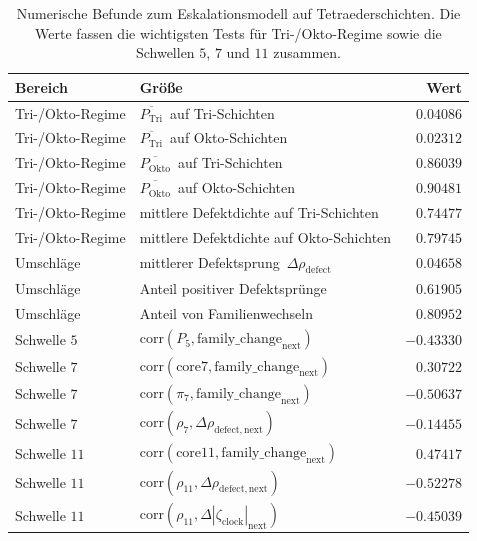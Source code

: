 \documentclass[11pt,a4paper]{article}
\theoremstyle{remark}
\begin{document}
	\begin{table}[t]
		\centering
		\caption{Numerische Befunde zum Eskalationsmodell auf Tetraederschichten. Die Werte fassen die wichtigsten Tests für Tri-/Okto-Regime sowie die Schwellen $5$, $7$ und $11$ zusammen.}
		\label{tab:eskalation}
		\begin{tabular}{@{}llr@{}}
			\toprule
			Bereich & Größe & Wert \\
			\midrule
			Tri-/Okto-Regime
			& $\overline{P_{\mathrm{Tri}}}\,$ auf Tri-Schichten & $0.04086$ \\
			Tri-/Okto-Regime
			& $\overline{P_{\mathrm{Tri}}}\,$ auf Okto-Schichten & $0.02312$ \\
			Tri-/Okto-Regime
			& $\overline{P_{\mathrm{Okto}}}\,$ auf Tri-Schichten & $0.86039$ \\
			Tri-/Okto-Regime
			& $\overline{P_{\mathrm{Okto}}}\,$ auf Okto-Schichten & $0.90481$ \\
			Tri-/Okto-Regime
			& mittlere Defektdichte auf Tri-Schichten & $0.74477$ \\
			Tri-/Okto-Regime
			& mittlere Defektdichte auf Okto-Schichten & $0.79745$ \\
			\midrule
			Umschläge
			& mittlerer Defektsprung $\,\Delta \rho_{\mathrm{defect}}$ & $0.04658$ \\
			Umschläge
			& Anteil positiver Defektsprünge & $0.61905$ \\
			Umschläge
			& Anteil von Familienwechseln & $0.80952$ \\
			\midrule
			Schwelle $5$
			& $\mathrm{corr}(P_5,\mathrm{family\_change}_{\mathrm{next}})$ & $-0.43330$ \\
			\midrule
			Schwelle $7$
			& $\mathrm{corr}(\mathrm{core7},\mathrm{family\_change}_{\mathrm{next}})$ & $0.30722$ \\
			Schwelle $7$
			& $\mathrm{corr}(\pi_7,\mathrm{family\_change}_{\mathrm{next}})$ & $-0.50637$ \\
			Schwelle $7$
			& $\mathrm{corr}(\rho_7,\Delta \rho_{\mathrm{defect,next}})$ & $-0.14455$ \\
			\midrule
			Schwelle $11$
			& $\mathrm{corr}(\mathrm{core11},\mathrm{family\_change}_{\mathrm{next}})$ & $0.47417$ \\
			Schwelle $11$
			& $\mathrm{corr}(\rho_{11},\Delta \rho_{\mathrm{defect,next}})$ & $-0.52278$ \\
			Schwelle $11$
			& $\mathrm{corr}(\rho_{11},\Delta |\zeta_{\mathrm{clock}}|_{\mathrm{next}})$ & $-0.45039$ \\
			\bottomrule
		\end{tabular}
	\end{table}
	
\end{document}
